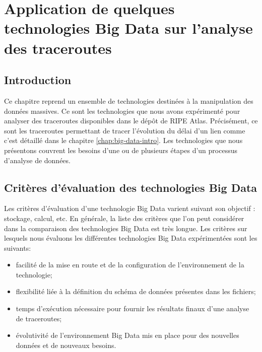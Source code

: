 \chapter{Application de quelques technologies Big Data sur l'analyse des  traceroutes} \label{chap:application-on-traceroutes}


\section{Introduction}

Ce chapitre reprend un ensemble de   technologies destinées  à la manipulation des données massives. Ce sont les technologies que nous avons expérimenté pour analyser des traceroutes disponibles dans le dépôt de RIPE Atlas. Précisément, ce sont les traceroutes permettant de tracer l'évolution du délai d'un lien comme c'est détaillé dans le chapitre \ref{chap:big-data-intro}.
Les technologies que nous présentons  couvrent les besoins d'une ou de plusieurs étapes d'un processus d'analyse de données.
 

\section{Critères d'évaluation des technologies  Big Data}
Les critères d'évaluation d'une technologie Big Data  varient  suivant son objectif : stockage, calcul, etc.  En générale, la liste des critères que l'on peut considérer dans la comparaison des technologies Big Data est très longue.  Les critères sur lesquels nous  évaluons  les différentes technologies  Big Data expérimentées sont les suivants:
\begin{itemize}
	\item facilité de la mise en route et de la configuration de l'environnement de la technologie;
	\item flexibilité liée à la définition du  schéma de  données présentes dans les fichiers;
	\item temps d'exécution nécessaire pour fournir les résultats finaux d'une analyse de traceroutes;
	\item évolutivité de l'environnement Big Data mis en place pour des nouvelles données et de nouveaux besoins.
\end{itemize}

